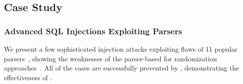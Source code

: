 %








\subsection{Case Study}
\label{subsec:casestudy}

\subsubsection{Advanced SQL Injections Exploiting Parsers}
\label{subsubsec:advanced_sql_injection}
We present a few sophisticated injection attacks exploiting flaws of 11 popular parsers~\cite{andialbrecht/sqlparse, xwb1989/sqlparser, client9/libinjection, greenlion/PHP-SQL-Parser, moz-sql-parser, hyrise/sql-parser, alibaba/nquery, phpmyadmin/sql-parser, flora-sql-parser, node-sql-parser, druid-sql-parser}, showing the weaknesses of the parser-based for randomization approaches~\cite{sqlrand, autorand, diglossia}.
All of the cases are successfully prevented by \sysname, demonstrating the effectiveness of \sysname.
%
%


